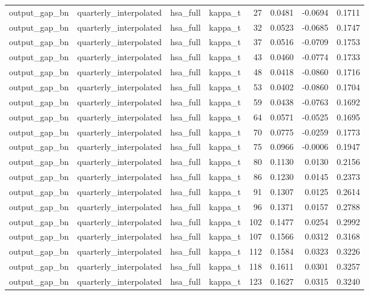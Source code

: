 \begin{tabular}{llllrrrr}
output\_gap\_bn & quarterly\_interpolated & hsa\_full & kappa\_t & 27 & 0.0481 & -0.0694 & 0.1711 \\
output\_gap\_bn & quarterly\_interpolated & hsa\_full & kappa\_t & 32 & 0.0523 & -0.0685 & 0.1747 \\
output\_gap\_bn & quarterly\_interpolated & hsa\_full & kappa\_t & 37 & 0.0516 & -0.0709 & 0.1753 \\
output\_gap\_bn & quarterly\_interpolated & hsa\_full & kappa\_t & 43 & 0.0460 & -0.0774 & 0.1733 \\
output\_gap\_bn & quarterly\_interpolated & hsa\_full & kappa\_t & 48 & 0.0418 & -0.0860 & 0.1716 \\
output\_gap\_bn & quarterly\_interpolated & hsa\_full & kappa\_t & 53 & 0.0402 & -0.0860 & 0.1704 \\
output\_gap\_bn & quarterly\_interpolated & hsa\_full & kappa\_t & 59 & 0.0438 & -0.0763 & 0.1692 \\
output\_gap\_bn & quarterly\_interpolated & hsa\_full & kappa\_t & 64 & 0.0571 & -0.0525 & 0.1695 \\
output\_gap\_bn & quarterly\_interpolated & hsa\_full & kappa\_t & 70 & 0.0775 & -0.0259 & 0.1773 \\
output\_gap\_bn & quarterly\_interpolated & hsa\_full & kappa\_t & 75 & 0.0966 & -0.0006 & 0.1947 \\
output\_gap\_bn & quarterly\_interpolated & hsa\_full & kappa\_t & 80 & 0.1130 & 0.0130 & 0.2156 \\
output\_gap\_bn & quarterly\_interpolated & hsa\_full & kappa\_t & 86 & 0.1230 & 0.0145 & 0.2373 \\
output\_gap\_bn & quarterly\_interpolated & hsa\_full & kappa\_t & 91 & 0.1307 & 0.0125 & 0.2614 \\
output\_gap\_bn & quarterly\_interpolated & hsa\_full & kappa\_t & 96 & 0.1371 & 0.0157 & 0.2788 \\
output\_gap\_bn & quarterly\_interpolated & hsa\_full & kappa\_t & 102 & 0.1477 & 0.0254 & 0.2992 \\
output\_gap\_bn & quarterly\_interpolated & hsa\_full & kappa\_t & 107 & 0.1566 & 0.0312 & 0.3168 \\
output\_gap\_bn & quarterly\_interpolated & hsa\_full & kappa\_t & 112 & 0.1584 & 0.0323 & 0.3226 \\
output\_gap\_bn & quarterly\_interpolated & hsa\_full & kappa\_t & 118 & 0.1611 & 0.0301 & 0.3257 \\
output\_gap\_bn & quarterly\_interpolated & hsa\_full & kappa\_t & 123 & 0.1627 & 0.0315 & 0.3240 \\

\end{tabular}
